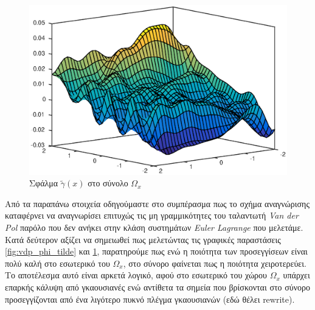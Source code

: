 \begin{figure}
	\includegraphics{plots/experiments/vdp/gamma_hat_error.eps}
	\caption{Σφάλμα $\tilde{\gamma}(x)$ στο σύνολο $\Omega_x$}
	\label{fig:vdp_gamma_tilde}
\end{figure}

Από τα παραπάνω στοιχεία οδηγούμαστε στο συμπέρασμα πως το σχήμα αναγνώρισης καταφέρνει να αναγνωρίσει επιτυχώς τις μη γραμμικότητες του  ταλαντωτή \textit{Van der Pol} παρόλο που δεν ανήκει στην κλάση συστημάτων \textit{Euler Lagrange} που μελετάμε. Κατά δεύτερον αξίζει να σημειωθεί πως μελετώντας τις γραφικές παραστάσεις \ref{fig:vdp_phi_tilde} και \ref{fig:vdp_gamma_tilde}, παρατηρούμε πως ενώ η ποιότητα των προσεγγίσεων είναι πολύ καλή στο εσωτερικό του $\Omega_x$, στο σύνορο φαίνεται πως η ποιότητα χειροτερεύει. Το αποτέλεσμα αυτό είναι αρκετά λογικό, αφού στο εσωτερικό του χώρου $\Omega_x$ υπάρχει επαρκής κάλυψη από γκαουσιανές ενώ αντίθετα τα σημεία που βρίσκονται στο σύνορο προσεγγίζονται από ένα λιγότερο πυκνό πλέγμα γκαουσιανών (εδώ θέλει rewrite).



\pagebreak

